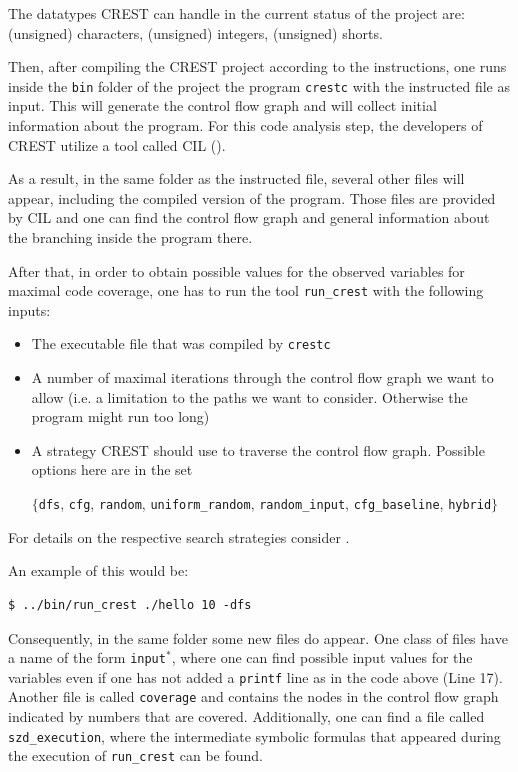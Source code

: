 \documentclass[oribibl]{llncs}
\begin{document}
\begin{remark}
  \label{rmrk:DataTypes}
  The datatypes \textsc{CREST} can handle in the current status of the
  project are: (unsigned) characters, (unsigned) integers, (unsigned) shorts.
\end{remark}

Then, after compiling the \textsc{CREST} project according to the
instructions, one runs inside the \texttt{bin} folder of the project
the program \texttt{crestc} with the instructed file as input. This
will generate the control flow graph and will collect initial information
about the program. For this code analysis step, the developers of
\textsc{CREST} utilize a tool called \textsc{CIL} (\cite{necula2002cil}).

As a result, in the same folder as the instructed file, several other
files will appear, including the compiled version of the
program. Those files are provided by \textsc{CIL} and one can find the
control flow graph and general information about the branching inside
the program there. %

After that, in order to obtain possible values for the observed
variables for maximal code coverage, one has to run the tool
\texttt{run\_crest} with the following inputs:
\begin{itemize}
  \item The executable file that was compiled by \texttt{crestc}
  \item A number of maximal iterations through the control flow graph
    we want to allow (i.e. a limitation to the paths we
    want to consider. Otherwise the program might run too long)
  \item A strategy \textsc{CREST} should use to traverse the control
    flow graph. Possible options here are in the set
\begin{center}
$\{$\texttt{dfs}, \texttt{cfg}, \texttt{random},
    \texttt{uniform\_random}, \texttt{random\_input}, 
    \texttt{cfg\_baseline}, \texttt{hybrid}$\}$
\end{center}
\end{itemize}
For details on the respective search strategies consider
\cite{CREST}.

An example of this would be:
\begin{verbatim}
$ ../bin/run_crest ./hello 10 -dfs
\end{verbatim}

Consequently, in the same folder some new files do appear. One class of
files have a name of the form \texttt{input}${}^*$, where one can find possible input
values for the variables even if one has not added a \texttt{printf} line as in the
code above (Line 17). Another file is called \texttt{coverage} and contains the
nodes in the control flow graph indicated by numbers that are
covered. Additionally, one can find a file called
\texttt{szd\_execution}, where the intermediate symbolic formulas that
appeared during the execution of \texttt{run\_crest} can be found.
\end{document}

